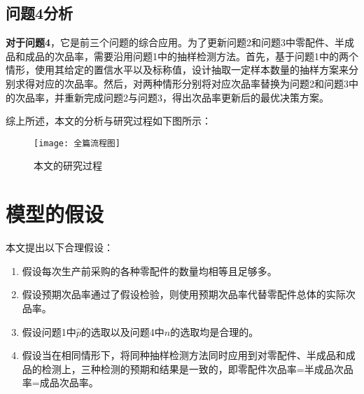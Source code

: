 \documentclass[withoutpreface,bwprint]{cumcmthesis} %
\begin{document}
\subsection{问题4分析}

\textbf{对于问题4}，它是前三个问题的综合应用。为了更新问题2和问题3中零配件、半成品和成品的次品率，需要沿用问题1中的抽样检测方法。首先，基于问题1中的两个情形，使用其给定的置信水平以及标称值，设计抽取一定样本数量的抽样方案来分别求得对应的次品率。然后，对两种情形分别将对应次品率替换为问题2和问题3中的次品率，并重新完成问题2与问题3，得出次品率更新后的最优决策方案。

综上所述，本文的分析与研究过程如下图所示：
\begin{figure}[htbp]  %
	\centering  %
	\texttt{[image: 全篇流程图]} %
	\caption{本文的研究过程}  
\end{figure}



\section{模型的假设}

本文提出以下合理假设：

\begin{enumerate}[label=\bfseries \arabic*., 
	itemsep=0.5pt, %
	topsep=0.5pt, %
	parsep=0ex]  %
	\item 假设每次生产前采购的各种零配件的数量均相等且足够多。
	\item 假设预期次品率通过了假设检验，则使用预期次品率代替零配件总体的实际次品率。
	\item 假设问题1中$\hat{p}$的选取以及问题4中$n$的选取均是合理的。
	\item 假设当在相同情形下，将同种抽样检测方法同时应用到对零配件、半成品和成品的检测上，三种检测的预期和结果是一致的，即零配件次品率=半成品次品率=成品次品率。
\end{enumerate}
\end{document}
